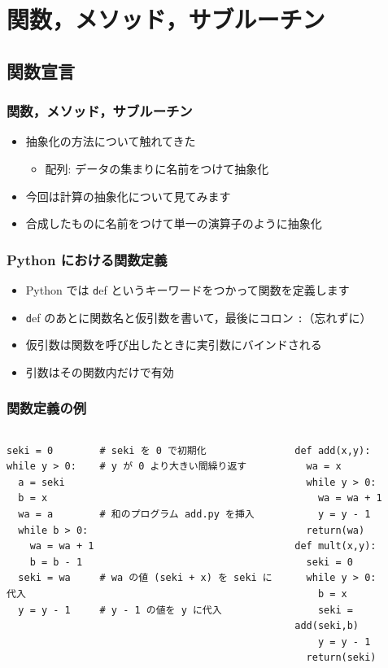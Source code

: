 %
%
\section{関数，メソッド，サブルーチン}
\subsection{関数宣言}
\begin{frame}[containsverbatim,label=function,shrink]
\frametitle{関数，メソッド，サブルーチン}
  \begin{itemize}
\item 抽象化の方法について触れてきた
    \begin{itemize}
\item 配列: データの集まりに名前をつけて抽象化
    \end{itemize}
\item 今回は計算の抽象化について見てみます
\item 合成したものに名前をつけて単一の演算子のように抽象化
  \end{itemize}
\end{frame}
\begin{frame}
\frametitle{Python における関数定義}
  \begin{itemize}
\item Python では {\texttt def} というキーワードをつかって関数を定義します
\item {\texttt def} のあとに関数名と仮引数を書いて，最後にコロン {\texttt :}（忘れずに）
\item 仮引数は関数を呼び出したときに実引数にバインドされる
\item 引数はその関数内だけで有効
  \end{itemize}
\end{frame}
\begin{frame}
\frametitle{関数定義の例}
  \begin{columns}[t]
    \begin{column}{0.65\textwidth}
      \begin{lstlisting}[caption={mult\_basicsonly.py},label=lst:definefun]
seki = 0        # seki を 0 で初期化
while y > 0:    # y が 0 より大きい間繰り返す
  a = seki
  b = x
  wa = a        # 和のプログラム add.py を挿入
  while b > 0:
    wa = wa + 1
    b = b - 1
  seki = wa     # wa の値 (seki + x) を seki に代入
  y = y - 1     # y - 1 の値を y に代入
      \end{lstlisting}
    \end{column}
    \begin{column}{0.3\textwidth}
      \begin{lstlisting}[caption={mult\_basicsonly.py},label=lst:definefun2,firstnumber=last]
def add(x,y):
  wa = x 
  while y > 0:
    wa = wa + 1
    y = y - 1
  return(wa)
def mult(x,y):
  seki = 0
  while y > 0:
    b = x
    seki = add(seki,b)
    y = y - 1
  return(seki)
      \end{lstlisting}
    \end{column}
  \end{columns}
\end{frame}
